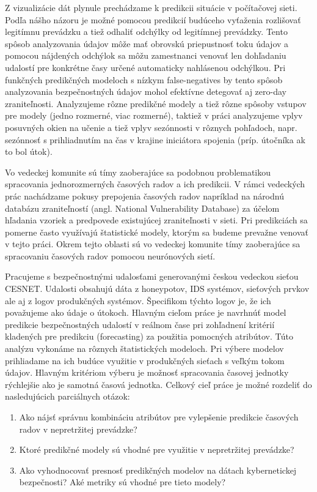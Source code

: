\documentclass[thesismargins, thesislinespacing, openright, upjsfrontpage, combineabstracts]{rnthesis}
\begin{document}
Z vizualizácie dát plynule prechádzame k predikcii situácie v počítačovej sieti. Podľa nášho názoru je možné pomocou predikcií budúceho vyťaženia rozlišovať legitímnu prevádzku a tiež odhaliť odchýlky od legitímnej prevádzky. Tento spôsob analyzovania údajov môže mať obrovskú priepustnosť toku údajov a pomocou nájdených odchýlok sa môžu zamestnanci venovať len dohľadaniu udalostí pre konkrétne časy určené automaticky nahlásenou odchýlkou. Pri funkčných predikčných modeloch s nízkym false-negatives by tento spôsob analyzovania bezpečnostných údajov mohol efektívne detegovať aj zero-day zraniteľnosti. Analyzujeme rôzne predikčné modely a tiež rôzne spôsoby vstupov pre modely (jedno rozmerné, viac rozmerné), taktiež v práci analyzujeme vplyv posuvných okien na učenie a tiež vplyv sezónnosti v rôznych pohľadoch, napr. sezónnosť s prihliadnutím na čas v krajine iniciátora spojenia (príp. útočníka ak to bol útok).

Vo vedeckej komunite sú tímy zaoberajúce sa podobnou problematikou spracovania jednorozmerných časových radov a ich predikcii. V rámci vedeckých prác nachádzame pokusy prepojenia časových radov napríklad na národnú databázu zraniteľností (angl. National Vulnerability Database) za účelom hľadania vzoriek a predpovede existujúcej zraniteľnosti v sieti. Pri predikciách sa pomerne často využívajú štatistické modely, ktorým sa budeme prevažne venovať v tejto práci. Okrem tejto oblasti sú vo vedeckej komunite tímy zaoberajúce sa spracovaniu časových radov pomocou neurónových sietí.

Pracujeme s bezpečnostnými udalosťami generovanými českou vedeckou sieťou CESNET. Udalosti obsahujú dáta z honeypotov, IDS systémov, sieťových prvkov ale aj z logov produkčných systémov. Špecifikom týchto logov je, že ich považujeme ako údaje o útokoch. Hlavným cieľom práce je navrhnúť model predikcie bezpečnostných udalostí v reálnom čase pri zohľadnení kritérií kladených pre predikciu (forecasting) za použitia pomocných atribútov. Túto analýzu vykonáme na rôznych štatistických modeloch. Pri výbere modelov prihliadame na ich budúce využitie v produkčných sieťach s veľkým tokom údajov. Hlavným kritériom výberu je možnosť spracovania časovej jednotky rýchlejšie ako je samotná časová jednotka. Celkový cieľ práce je možné rozdeliť do nasledujúcich parciálnych otázok:

\begin{enumerate}
  \item Ako nájsť správnu kombináciu atribútov pre vylepšenie predikcie časových radov v nepretržitej prevádzke?
  \item Ktoré predikčné modely sú vhodné pre využitie v nepretržitej prevádzke?
  \item Ako vyhodnocovať presnosť predikčných modelov na dátach kybernetickej bezpečnosti? Aké metriky sú vhodné pre tieto modely?
\end{enumerate}
\end{document}
